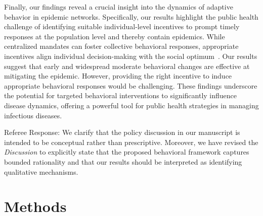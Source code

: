 \documentclass[9pt,twocolumn,twoside]{pnas-new}
\newcommand{\green}[1]{{\textcolor{green!50!black}{#1}}}
\begin{document}
Finally, our findings reveal a crucial insight into the dynamics of adaptive behavior in epidemic networks. Specifically, our results highlight the public health challenge of identifying suitable individual-level incentives to prompt timely responses at the population level and thereby contain epidemics.
%
While centralized mandates can foster collective behavioral responses, appropriate incentives align individual decision-making with the social optimum~\cite{Traulsen23,crabtree2024influential}.
%
Our results suggest that early and widespread moderate behavioral changes are effective at mitigating the epidemic. However, providing the right incentive to induce appropriate behavioral responses would be challenging.
These findings underscore the potential for targeted behavioral interventions to significantly influence disease dynamics, offering a powerful tool for public health strategies in managing infectious diseases.

\green{Referee Response: We clarify that the policy discussion in our manuscript is intended
to be conceptual rather than prescriptive. Moreover, we have revised the \textit{Discussion}
to explicitly state that the proposed behavioral framework captures bounded rationality and that
our results should be interpreted as identifying qualitative mechanisms.}


\section*{Methods}
\end{document}
